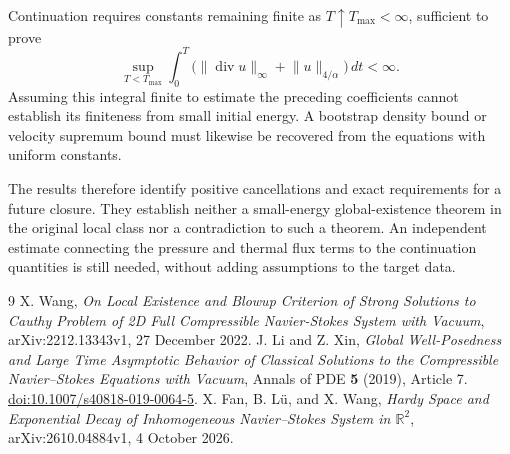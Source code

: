 \documentclass[10pt,twoside]{article}
\newcommand{\R}{\mathbb R}
\newcommand{\dt}{\,dt}
\newcommand{\Div}{\operatorname{div}}
\newcommand{\norm}[2]{\lVert#1\rVert_{#2}}
\begin{document}
Continuation requires constants remaining finite as
$T\uparrow T_{\max}<\infty$, sufficient to prove
\[
 \sup_{T<T_{\max}}\int_0^T
       \bigl(\norm{\Div u}{\infty}+\norm{u}{4/\alpha}\bigr)\dt<\infty.
\]
Assuming this integral finite to estimate the preceding coefficients
cannot establish its finiteness from small initial energy.
A bootstrap density bound or velocity supremum bound must likewise
be recovered from the equations with uniform constants.

The results therefore identify positive cancellations and exact
requirements for a future closure. They establish neither a
small-energy global-existence theorem in the original local class
nor a contradiction to such a theorem.
An independent estimate connecting the pressure and thermal flux terms
to the continuation quantities is still needed, without adding
assumptions to the target data.

\begin{thebibliography}{9}
X. Wang,
\emph{On Local Existence and Blowup Criterion of Strong Solutions to
Cauthy Problem of 2D Full Compressible Navier-Stokes System with Vacuum},
arXiv:2212.13343v1, 27 December 2022.
J. Li and Z. Xin,
\emph{Global Well-Posedness and Large Time Asymptotic Behavior of Classical
Solutions to the Compressible Navier--Stokes Equations with Vacuum},
Annals of PDE \textbf{5} (2019), Article 7.
\href{https://doi.org/10.1007/s40818-019-0064-5}
{doi:10.1007/s40818-019-0064-5}.
X. Fan, B. L\"u, and X. Wang,
\emph{Hardy Space and Exponential Decay of Inhomogeneous Navier--Stokes
System in $\R^2$},
arXiv:2610.04884v1, 4 October 2026.
\end{thebibliography}
\end{document}
